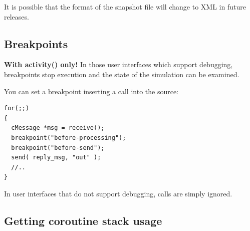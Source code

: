 It is possible that the format of the snapshot file will change to XML
in future {\opp} releases.



\subsection{Breakpoints}

\textbf{With activity() only!} In those user interfaces which support
debugging, breakpoints stop execution and the state of the simulation
can be examined.

You can set a breakpoint inserting a
 call into the source:

\begin{verbatim}
for(;;)
{
  cMessage *msg = receive();
  breakpoint("before-processing");
  breakpoint("before-send");
  send( reply_msg, "out" );
  //..
}
\end{verbatim}


In user interfaces that do not support debugging, 
calls are simply ignored.





%
%
%
%





\subsection{Getting coroutine stack usage}

